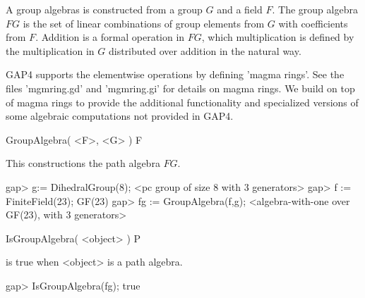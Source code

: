 %
%
%

A group algebras is constructed from a  group $G$ and a field $F$. 
The group algebra $FG$ is the set of linear combinations of group 
elements from $G$ with coefficients from $F$. Addition is a formal
operation in $FG$, which multiplication is defined by the multiplication 
in $G$ distributed over addition in the natural way.

GAP4 supports the elementwise operations by defining
'magma rings'. See the files 'mgmring.gd' and
'mgmring.gi' for details on magma rings. We build on top of
magma rings to provide the additional functionality and specialized
versions of some algebraic computations not provided in GAP4.


\>GroupAlgebra( <F>, <G> ) F

This constructions the path algebra $FG$.

\beginexample 
gap> g:= DihedralGroup(8); 
<pc group of size 8 with 3 generators>
gap> f := FiniteField(23);
GF(23)
gap> fg := GroupAlgebra(f,g);
<algebra-with-one over GF(23), with 3 generators>
\endexample


\>IsGroupAlgebra( <object> ) P

is true when <object> is a path algebra.


\beginexample
gap> IsGroupAlgebra(fg);
true
\endexample


